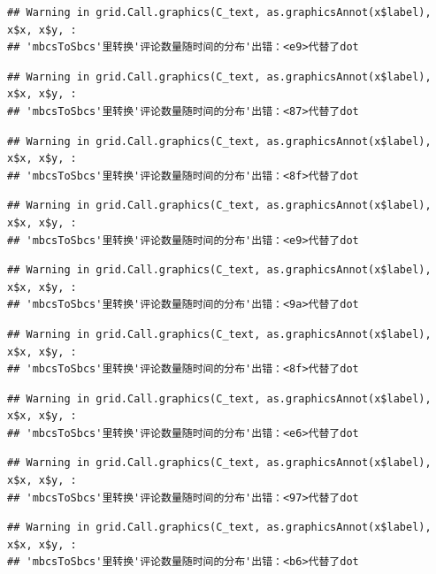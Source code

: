 \documentclass[
]{article}
\begin{document}
\begin{verbatim}
## Warning in grid.Call.graphics(C_text, as.graphicsAnnot(x$label), x$x, x$y, :
## 'mbcsToSbcs'里转换'评论数量随时间的分布'出错：<e9>代替了dot
\end{verbatim}

\begin{verbatim}
## Warning in grid.Call.graphics(C_text, as.graphicsAnnot(x$label), x$x, x$y, :
## 'mbcsToSbcs'里转换'评论数量随时间的分布'出错：<87>代替了dot
\end{verbatim}

\begin{verbatim}
## Warning in grid.Call.graphics(C_text, as.graphicsAnnot(x$label), x$x, x$y, :
## 'mbcsToSbcs'里转换'评论数量随时间的分布'出错：<8f>代替了dot
\end{verbatim}

\begin{verbatim}
## Warning in grid.Call.graphics(C_text, as.graphicsAnnot(x$label), x$x, x$y, :
## 'mbcsToSbcs'里转换'评论数量随时间的分布'出错：<e9>代替了dot
\end{verbatim}

\begin{verbatim}
## Warning in grid.Call.graphics(C_text, as.graphicsAnnot(x$label), x$x, x$y, :
## 'mbcsToSbcs'里转换'评论数量随时间的分布'出错：<9a>代替了dot
\end{verbatim}

\begin{verbatim}
## Warning in grid.Call.graphics(C_text, as.graphicsAnnot(x$label), x$x, x$y, :
## 'mbcsToSbcs'里转换'评论数量随时间的分布'出错：<8f>代替了dot
\end{verbatim}

\begin{verbatim}
## Warning in grid.Call.graphics(C_text, as.graphicsAnnot(x$label), x$x, x$y, :
## 'mbcsToSbcs'里转换'评论数量随时间的分布'出错：<e6>代替了dot
\end{verbatim}

\begin{verbatim}
## Warning in grid.Call.graphics(C_text, as.graphicsAnnot(x$label), x$x, x$y, :
## 'mbcsToSbcs'里转换'评论数量随时间的分布'出错：<97>代替了dot
\end{verbatim}

\begin{verbatim}
## Warning in grid.Call.graphics(C_text, as.graphicsAnnot(x$label), x$x, x$y, :
## 'mbcsToSbcs'里转换'评论数量随时间的分布'出错：<b6>代替了dot
\end{verbatim}
\end{document}
